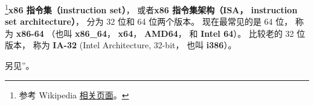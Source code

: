 
\begin{issues}
\issueDraft
\end{issues}

\footnote{参考 Wikipedia \href{https://en.wikipedia.org/wiki/X86-64}{相关页面}。}\textbf{x86 指令集（instruction set）}， 或者\textbf{x86 指令集架构（ISA， instruction set architecture）}， 分为 32 位和 64 位两个版本。 现在最常见的是 64 位， 称为 \textbf{x86-64} （也叫 \textbf{x86_64}， \textbf{x64}， \textbf{AMD64}， 和 \textbf{Intel 64}）。 比较老的 32 位版本， 称为 \textbf{IA-32} (Intel Architecture, 32-bit， 也叫 \textbf{i386}）。

另见”。

